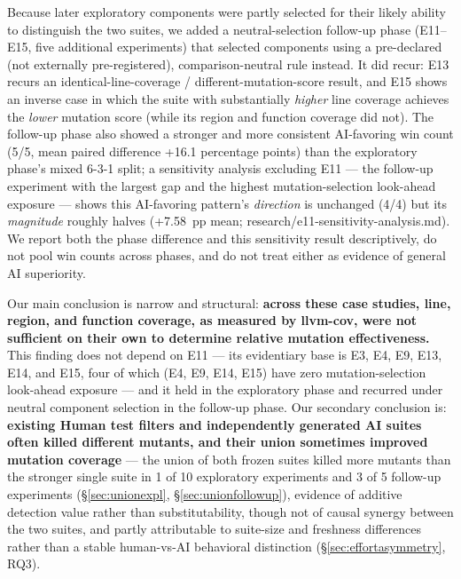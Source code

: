 \documentclass[10pt,conference]{IEEEtran}
\begin{document}
Because later exploratory components were partly selected for their likely ability to distinguish the two suites, we added a neutral-selection follow-up phase (E11--E15, five additional experiments) that selected components using a pre-declared (not externally pre-registered), comparison-neutral rule instead. It did recur: E13 recurs an identical-line-coverage / different-mutation-score result, and E15 shows an inverse case in which the suite with substantially \emph{higher} line coverage achieves the \emph{lower} mutation score (while its region and function coverage did not). The follow-up phase also showed a stronger and more consistent AI-favoring win count (5/5, mean paired difference +16.1 percentage points) than the exploratory phase's mixed 6-3-1 split; a sensitivity analysis excluding E11 — the follow-up experiment with the largest gap and the highest mutation-selection look-ahead exposure — shows this AI-favoring pattern's \emph{direction} is unchanged (4/4) but its \emph{magnitude} roughly halves (+7.58~pp mean; research/e11-sensitivity-analysis.md). We report both the phase difference and this sensitivity result descriptively, do not pool win counts across phases, and do not treat either as evidence of general AI superiority.

Our main conclusion is narrow and structural: \textbf{across these case studies, line, region, and function coverage, as measured by llvm-cov, were not sufficient on their own to determine relative mutation effectiveness.} This finding does not depend on E11 — its evidentiary base is E3, E4, E9, E13, E14, and E15, four of which (E4, E9, E14, E15) have zero mutation-selection look-ahead exposure — and it held in the exploratory phase and recurred under neutral component selection in the follow-up phase. Our secondary conclusion is: \textbf{existing Human test filters and independently generated AI suites often killed different mutants, and their union sometimes improved mutation coverage} — the union of both frozen suites killed more mutants than the stronger single suite in 1 of 10 exploratory experiments and 3 of 5 follow-up experiments (\S\ref{sec:unionexpl}, \S\ref{sec:unionfollowup}), evidence of additive detection value rather than substitutability, though not of causal synergy between the two suites, and partly attributable to suite-size and freshness differences rather than a stable human-vs-AI behavioral distinction (\S\ref{sec:effortasymmetry}, RQ3).
\end{document}
